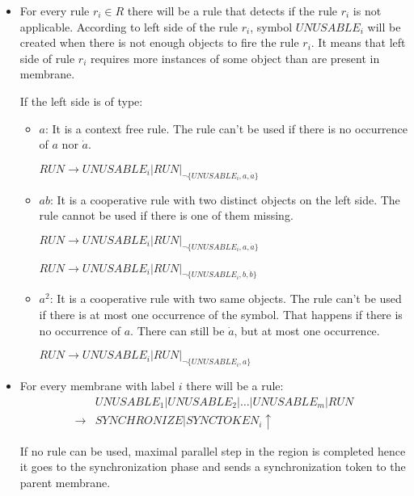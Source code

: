 \begin{dokaz}
\begin{itemize}
    \item For every rule $r_i\in R$ there will be a rule that detects if the rule $r_i$ is not applicable. According to left side of the rule $r_i$, symbol $\mathit{UNUSABLE_i}$ will be created when there is not enough objects to fire the rule $r_i$. It means that left side of rule $r_i$ requires more instances of some object than are present in membrane.

    If the left side is of type:
    \begin{itemize}
      \item $a$: It is a context free rule. The rule can't be used if there is no occurrence of $a$ nor $\dot{a}$.

      $\mathit{RUN} \rightarrow \mathit{UNUSABLE_i}|\mathit{RUN}|_{\neg\{\mathit{UNUSABLE_i}, a, \dot{a}\}}$

      \item $ab$: It is a cooperative rule with two distinct objects on the left side. The rule cannot be used if there is one of them missing.

      $\mathit{RUN} \rightarrow \mathit{UNUSABLE_i}|\mathit{RUN}|_{\neg\{\mathit{UNUSABLE_i}, a, \dot{a}\}}$

      $\mathit{RUN} \rightarrow \mathit{UNUSABLE_i}|\mathit{RUN}|_{\neg\{\mathit{UNUSABLE_i}, b, \dot{b}\}}$

      \item $a^2$: It is a cooperative rule with two same objects. The rule can't be used if there is at most one occurrence of the symbol. That happens if there is no occurrence of $a$. There can still be $\dot{a}$, but at most one occurrence.

      $\mathit{RUN} \rightarrow \mathit{UNUSABLE_i}|\mathit{RUN}|_{\neg\{\mathit{UNUSABLE_i}, a\}}$
    \end{itemize}

    \item For every membrane with label $i$ there will be a rule:
    \begin{align*}
      &\mathit{UNUSABLE_1}|\mathit{UNUSABLE_2}|\dots|\mathit{UNUSABLE_m}|\mathit{RUN} \\
      \rightarrow &\mathit{SYNCHRONIZE}|\mathit{SYNCTOKEN_i}\uparrow
    \end{align*}

    If no rule can be used, maximal parallel step in the region is completed hence it goes to the synchronization phase and sends a synchronization token to the parent membrane.


\end{itemize}
\end{dokaz}
